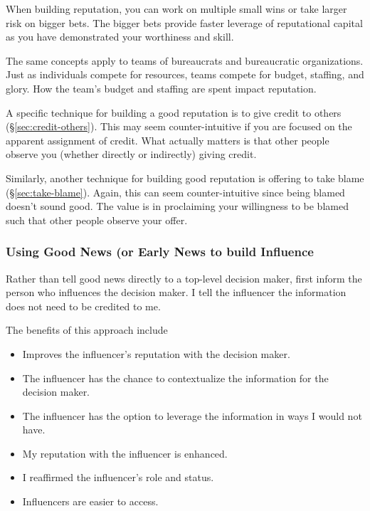 When building reputation, you can work on multiple small wins or take larger risk on bigger bets. The bigger bets provide faster leverage of reputational capital as you have demonstrated your worthiness and skill. 

The same concepts apply to teams of bureaucrats and bureaucratic organizations. Just as individuals compete for resources, teams compete for budget, staffing, and glory. How the team's budget and staffing are spent impact reputation. 

A specific technique for building a good reputation is to give credit to others (\S\ref{sec:credit-others}).
This may seem counter-intuitive if you are focused on the apparent assignment of credit. What actually matters is that other people observe you (whether directly or indirectly) giving credit. 

Similarly, another technique for building good reputation is offering to take blame (\S\ref{sec:take-blame}).
Again, this can seem counter-intuitive since being blamed doesn't sound good. The value is in proclaiming your willingness to be blamed such that other people observe your offer. 

\subsubsection{Using Good News (or Early News to build Influence}

Rather than tell good news directly to a top-level decision maker, first inform the person who influences the decision maker.
I tell the influencer the information does not need to be credited to me.

The benefits of this approach include
\begin{itemize}
    \item Improves the influencer's reputation with the decision maker.
    \item The influencer has the chance to contextualize the information for the decision maker.
    \item The influencer has the option to leverage the information in ways I would not have.
    \item My reputation with the influencer is enhanced.
    \item I reaffirmed the influencer's role and status.
    \item Influencers are easier to access.
\end{itemize}

